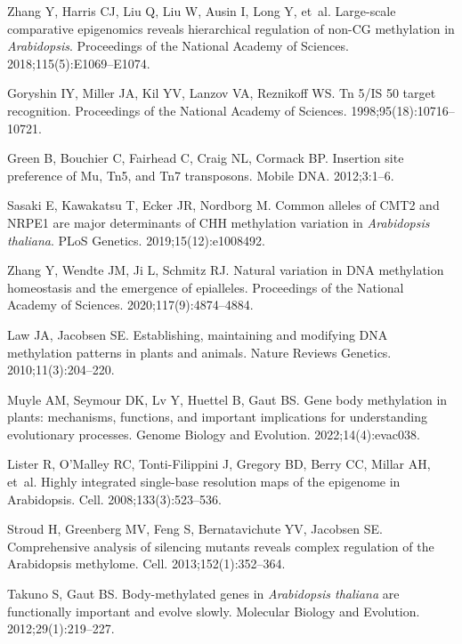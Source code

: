 \documentclass[10pt,draft,letterpaper]{article}
\begin{document}
\begin{thebibliography}{10}
Zhang Y, Harris CJ, Liu Q, Liu W, Ausin I, Long Y, et~al.
\newblock Large-scale comparative epigenomics reveals hierarchical regulation of non-CG methylation in \textit{Arabidopsis}.
\newblock Proceedings of the National Academy of Sciences. 2018;115(5):E1069--E1074.

Goryshin IY, Miller JA, Kil YV, Lanzov VA, Reznikoff WS.
\newblock Tn 5/IS 50 target recognition.
\newblock Proceedings of the National Academy of Sciences. 1998;95(18):10716--10721.

Green B, Bouchier C, Fairhead C, Craig NL, Cormack BP.
\newblock Insertion site preference of Mu, Tn5, and Tn7 transposons.
\newblock Mobile DNA. 2012;3:1--6.

Sasaki E, Kawakatsu T, Ecker JR, Nordborg M.
\newblock Common alleles of CMT2 and NRPE1 are major determinants of CHH methylation variation in \emph{Arabidopsis thaliana}.
\newblock PLoS Genetics. 2019;15(12):e1008492.

Zhang Y, Wendte JM, Ji L, Schmitz RJ.
\newblock Natural variation in DNA methylation homeostasis and the emergence of epialleles.
\newblock Proceedings of the National Academy of Sciences. 2020;117(9):4874--4884.

Law JA, Jacobsen SE.
\newblock Establishing, maintaining and modifying DNA methylation patterns in plants and animals.
\newblock Nature Reviews Genetics. 2010;11(3):204--220.

Muyle AM, Seymour DK, Lv Y, Huettel B, Gaut BS.
\newblock Gene body methylation in plants: mechanisms, functions, and important implications for understanding evolutionary processes.
\newblock Genome Biology and Evolution. 2022;14(4):evac038.

Lister R, O'Malley RC, Tonti-Filippini J, Gregory BD, Berry CC, Millar AH, et~al.
\newblock Highly integrated single-base resolution maps of the epigenome in Arabidopsis.
\newblock Cell. 2008;133(3):523--536.

Stroud H, Greenberg MV, Feng S, Bernatavichute YV, Jacobsen SE.
\newblock Comprehensive analysis of silencing mutants reveals complex regulation of the Arabidopsis methylome.
\newblock Cell. 2013;152(1):352--364.

Takuno S, Gaut BS.
\newblock Body-methylated genes in \emph{Arabidopsis thaliana} are functionally important and evolve slowly.
\newblock Molecular Biology and Evolution. 2012;29(1):219--227.


\end{thebibliography}
\end{document}
